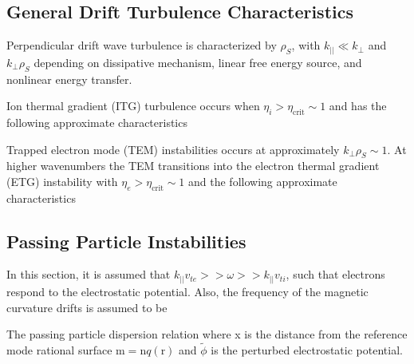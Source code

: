 \subsection{General Drift Turbulence Characteristics}

Perpendicular drift wave turbulence is characterized by $\rho_{S}$, with $k_{||} \ll k_{\bot}$ and $k_{\bot}\rho_{S}$ depending on dissipative mechanism, linear free energy source, and nonlinear energy transfer.\\


\noindent Ion thermal gradient (ITG) turbulence occurs when $\eta_{i} > \eta_{\textrm{crit}} \sim 1$ and has the following approximate characteristics \cite{tynan}

\noindent Trapped electron mode (TEM) instabilities occurs at approximately $k_{\bot}\rho_{S} \sim 1$. At higher wavenumbers the TEM transitions into the electron thermal gradient (ETG) instability with $\eta_{e} > \eta_{\textrm{crit}} \sim 1$ and the following approximate characteristics \cite{tynan}

\subsection{Passing Particle Instabilities}
In this section, it is assumed that $k_{||} v_{te}>> \omega >> k_{||}v_{ti}$, such that electrons respond to the electrostatic potential. Also, the frequency of the magnetic curvature drifts is assumed to be 

\noindent
The passing particle dispersion relation 
\hangindent=0.25in where x is the distance from the reference mode rational surface $\textrm{m}=\textrm{n} q(\textrm{r})$ and $\tilde{\phi}$ is the perturbed electrostatic potential.\\

